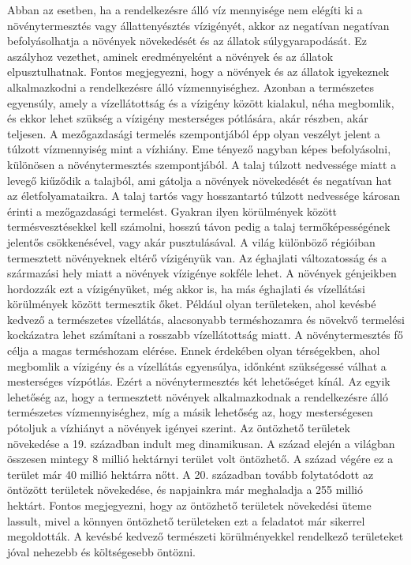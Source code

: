 \documentclass[a4paper,oneside,onecolumn,12pt]{LegrandOrangeBook}
\begin{document}
	Abban az esetben, ha a rendelkezésre álló víz mennyisége nem elégíti ki a növénytermesztés vagy állattenyésztés vízigényét, akkor az negatívan negatívan befolyásolhatja a növények növekedését és az állatok súlygyarapodását. Ez aszályhoz vezethet, aminek eredményeként a növények és az állatok elpusztulhatnak. Fontos megjegyezni, hogy a növények és az állatok igyekeznek alkalmazkodni a rendelkezésre álló vízmennyiséghez. Azonban a természetes egyensúly, amely a vízellátottság és a vízigény között kialakul, néha megbomlik, és ekkor lehet szükség a vízigény mesterséges pótlására, akár részben, akár teljesen.
	A mezőgazdasági termelés szempontjából épp olyan veszélyt jelent a túlzott vízmennyiség mint a vízhiány. Eme tényező nagyban képes befolyásolni, különösen a növénytermesztés szempontjából. A talaj túlzott nedvessége miatt a levegő kiűződik a talajból, ami gátolja a növények növekedését és negatívan hat az életfolyamataikra. A talaj tartós vagy hosszantartó túlzott nedvessége károsan érinti a mezőgazdasági termelést. Gyakran ilyen körülmények között termésvesztésekkel kell számolni, hosszú távon pedig a talaj termőképességének jelentős csökkenésével, vagy akár pusztulásával.
	A világ különböző régióiban termesztett növényeknek eltérő vízigényük van. Az éghajlati változatosság és a származási hely miatt a növények vízigénye sokféle lehet. A növények génjeikben hordozzák ezt a vízigényüket, még akkor is, ha más éghajlati és vízellátási körülmények között termesztik őket. Például olyan területeken, ahol kevésbé kedvező a természetes vízellátás, alacsonyabb terméshozamra és növekvő termelési kockázatra lehet számítani a rosszabb vízellátottság miatt.
	A növénytermesztés fő célja a magas terméshozam elérése. Ennek érdekében olyan térségekben, ahol megbomlik a vízigény és a vízellátás egyensúlya, időnként szükségessé válhat a mesterséges vízpótlás. Ezért a növénytermesztés két lehetőséget kínál. Az egyik lehetőség az, hogy a termesztett növények alkalmazkodnak a rendelkezésre álló természetes vízmennyiséghez, míg a másik lehetőség az, hogy mesterségesen pótoljuk a vízhiányt a növények igényei szerint.
	Az öntözhető területek növekedése a 19. században indult meg dinamikusan. A század elején a világban összesen mintegy 8 millió hektárnyi terület volt öntözhető. A század végére ez a terület már 40 millió hektárra nőtt. A 20. században tovább folytatódott az öntözött területek növekedése, és napjainkra már meghaladja a 255 millió hektárt. Fontos megjegyezni, hogy az öntözhető területek növekedési üteme lassult, mivel a könnyen öntözhető területeken ezt a feladatot már sikerrel megoldották. A kevésbé kedvező természeti körülményekkel rendelkező területeket jóval nehezebb és költségesebb öntözni.
\end{document}
